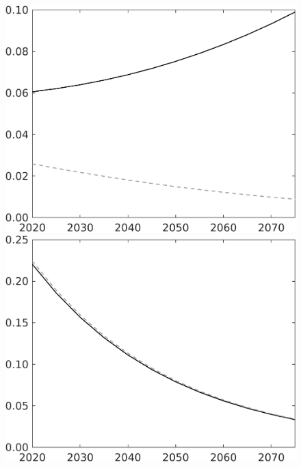\documentclass[12pt]{article}
\begin{document}
\begin{figure}[h!!]
\begin{minipage}[]{0.32\textwidth}
	\end{minipage}	
	\begin{minipage}[]{0.32\textwidth}
		\includegraphics[width=1\textwidth]{../../codding_model/own_basedOnFried/optimalPol_010922_revision/figures/all_13Sept22/LevTaufNoTauf_TaulCalib_regime0_G_spillover0_nsk1_xgr1_knspil1_sep1_LFlimit0_emsbase0_countec0_GovRev0_etaa0.79_lgd0.png}
	\end{minipage}	
	\begin{minipage}[]{0.32\textwidth}
		\includegraphics[width=1\textwidth]{../../codding_model/own_basedOnFried/optimalPol_010922_revision/figures/all_13Sept22/LevTaufNoTauf_TaulCalib_regime0_pf_spillover0_nsk1_xgr1_knspil1_sep1_LFlimit0_emsbase0_countec0_GovRev0_etaa0.79_lgd0.png}

\end{minipage}
\end{figure}
\end{document}

